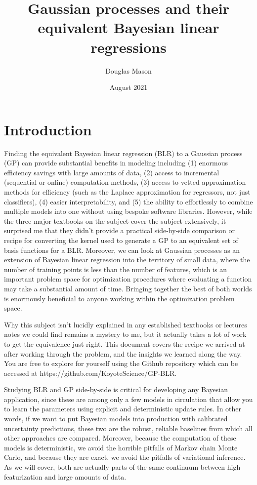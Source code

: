 \documentclass{article}
\title{Gaussian processes and their equivalent Bayesian linear regressions}
\author[1]{Douglas Mason}
\affil[1]{Koyote Science, LLC \footnote{\href{http://www.koyotescience.com}{\texttt{http://www.koyotescience.com}}}}
\date{August 2021}
\begin{document}
\maketitle

\section{Introduction}

Finding the equivalent Bayesian linear regression (BLR) to a Gaussian process (GP) can provide substantial benefits in modeling including (1) enormous efficiency savings with large amounts of data, (2) access to incremental (sequential or online) computation methods, (3) access to vetted approximation methods for efficiency (such as the Laplace approximation for regressors, not just classifiers), (4) easier interpretability, and (5) the ability to effortlessly to combine multiple models into one without using bespoke software libraries. However, while the three major textbooks on the subject \cite{bishop, murphy, rasmussen} cover the subject extensively, it surprised me that they didn't provide a practical side-by-side comparison or recipe for converting the kernel used to generate a GP to an equivalent set of basis functions for a BLR. Moreover, we can look at Gaussian processes as an extension of Bayesian linear regression into the territory of small data, where the number of training points is less than the number of features, which is an important problem space for optimization procedures where evaluating a function may take a substantial amount of time. Bringing together the best of both worlds is enormously beneficial to anyone working within the optimization problem space.

Why this subject isn't lucidly explained in any established textbooks or lectures notes we could find remains a mystery to me, but it actually takes a lot of work to get the equivalence just right. This document covers the recipe we arrived at after working through the problem, and the insights we learned along the way. You are free to explore for yourself using the  Github repository which can be accessed at https://github.com/KoyoteScience/GP-BLR.

Studying BLR and GP side-by-side is critical for developing any Bayesian application, since these are among only a few models in  circulation that allow you to learn the parameters using explicit and deterministic update rules. In other words, if we want to put Bayesian models into production with calibrated uncertainty predictions, these two are the robust, reliable baselines from which all other approaches are compared. Moreover, because the computation of these models is deterministic, we avoid the horrible pitfalls of Markov chain Monte Carlo, and because they are exact, we avoid the pitfalls of variational inference. As we will cover, both are actually parts of the same continuum between high featurization and large amounts of data. 
\end{document}
